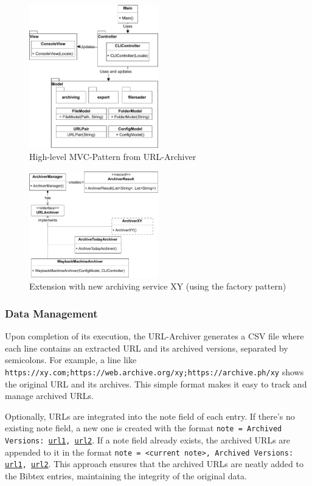 \begin{figure}
	\includegraphics[width=0.5\textwidth]{./diagrams/mvc_diagram-Highlevel_MVC.pdf}
	\centering
	\caption{High-level MVC-Pattern from URL-Archiver}
	\label{fig:mvc_highlevel}
\end{figure}

\begin{figure}
	\includegraphics[width=0.5\textwidth]{./diagrams/URL_Archiver_Class_Diagram-ArchiverManager.pdf}
	\centering
	\caption{Extension with new archiving service XY (using the factory pattern)}
	\label{fig:factory_pattern_archiving_services}
\end{figure}

\subsubsection{Data Management}
Upon completion of its execution, the URL-Archiver generates a CSV file where each line contains an extracted URL and its archived versions, separated by semicolons. For example, a line like \texttt{https://xy.com;https://web.archive.org/xy;https://archive.ph/xy} shows the original URL and its archives. This simple format makes it easy to track and manage archived URLs. 

Optionally, URLs are integrated into the note field of each entry. If there's no existing note field, a new one is created with the format \texttt{note = {Archived Versions: \url{url1}, \url{url2}}}. If a note field already exists, the archived URLs are appended to it in the format \texttt{note = {<current note>, Archived Versions: \url{url1}, \url{url2}}}. This approach ensures that the archived URLs are neatly added to the Bibtex entries, maintaining the integrity of the original data.

